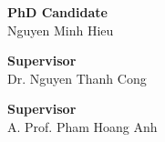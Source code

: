 \newpage

\vspace{1cm}
\noindent

\begin{center}
  \textbf{\large PhD Candidate} \\[3cm]
  Nguyen Minh Hieu
\end{center}

\vspace{1cm}

\noindent
\begin{minipage}[t]{0.48\textwidth}
  \centering
  \textbf{\large Supervisor} \\[3cm]
  Dr. Nguyen Thanh Cong
\end{minipage}
\begin{minipage}[t]{0.48\textwidth}
  \centering
  \textbf{\large Supervisor} \\[3cm]
  A. Prof. Pham Hoang Anh
\end{minipage}\hfill
